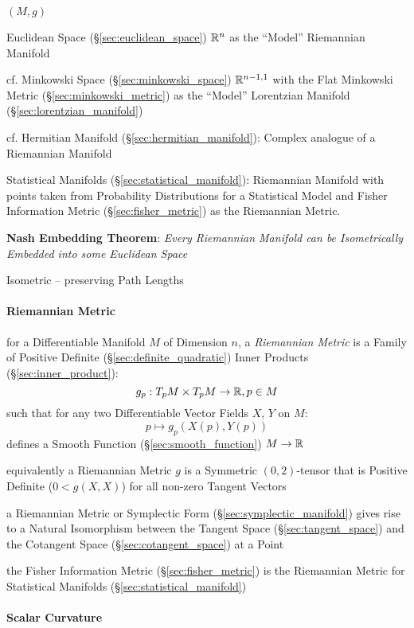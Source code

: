 $(M,g)$

Euclidean Space (\S\ref{sec:euclidean_space}) $\mathbb{R}^n$ as the
``Model'' Riemannian Manifold

cf. Minkowski Space (\S\ref{sec:minkowski_space}) $\mathbb{R}^{n-1,1}$
with the Flat Minkowski Metric (\S\ref{sec:minkowski_metric}) as the
``Model'' Lorentzian Manifold (\S\ref{sec:lorentzian_manifold})

cf. Hermitian Manifold (\S\ref{sec:hermitian_manifold}): Complex
analogue of a Riemannian Manifold

\fist Statistical Manifolds (\S\ref{sec:statistical_manifold}):
Riemannian Manifold with points taken from Probability Distributions
for a Statistical Model and Fisher Information Metric
(\S\ref{sec:fisher_metric}) as the Riemannian Metric.

\textbf{Nash Embedding Theorem}: \emph{Every Riemannian Manifold can be
  Isometrically Embedded into some Euclidean Space}

Isometric -- preserving Path Lengths



\paragraph{Riemannian Metric}\label{sec:riemannian_metric}\hfill

for a Differentiable Manifold $M$ of Dimension $n$, a \emph{Riemannian
  Metric} is a Family of Positive Definite
(\S\ref{sec:definite_quadratic}) Inner Products
(\S\ref{sec:inner_product}):
\[
  g_p : T_p M \times T_p M \rightarrow \mathbb{R}, p \in M
\]
such that for any two Differentiable Vector Fields $X$, $Y$ on $M$:
\[
  p \mapsto g_p (X(p), Y(p))
\]
defines a Smooth Function (\S\ref{sec:smooth_function}) $M \rightarrow
\mathbb{R}$

equivalently a Riemannian Metric $g$ is a Symmetric $(0,2)$-tensor
that is Positive Definite ($0 < g(X,X)$) for all non-zero Tangent
Vectors %

a Riemannian Metric or Symplectic Form (\S\ref{sec:symplectic_manifold}) gives
rise to a Natural Isomorphism between the Tangent Space
(\S\ref{sec:tangent_space}) and the Cotangent Space
(\S\ref{sec:cotangent_space}) at a Point

the Fisher Information Metric (\S\ref{sec:fisher_metric}) is the Riemannian
Metric for Statistical Manifolds (\S\ref{sec:statistical_manifold})



\paragraph{Scalar Curvature}\label{sec:scalar_curvature}\hfill

